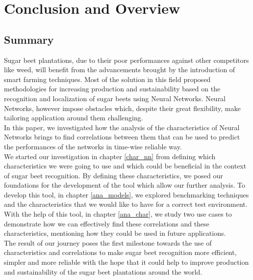 \chapter{Conclusion and Overview}

\section{Summary}
Sugar beet plantations, due to their poor performances against other competitors like weed, will benefit from the advancements brought by the introduction of smart farming techniques. Most of the solution in this field proposed methodologies for increasing production and sustainability based on the recognition and localization of sugar beets using Neural Networks. Neural Networks, however impose obstacles which, despite their great flexibility, make tailoring application around them challenging.\\ 
In this paper, we investigated how the analysis of the characteristics of Neural Networks brings to find correlations between them that can be used to predict the performances of the networks in time-wise reliable way.\\
We started our investigation in chapter \ref{char_nn} from defining which characteristics we were going to use and which could be beneficial in the context of sugar beet recognition. By defining these characteristics, we posed our foundations for the development of the tool which allow our further analysis. To develop this tool, in chapter \ref{ana_models}, we explored benchmarking techniques and the characteristics that we would like to have for a correct test environment. With the help of this tool, in chapter \ref{ana_char},  we study two use cases to demonstrate how we can effectively find these correlations and these characteristics, mentioning how they could be used in future applications. \\
The result of our journey poses the first milestone towards the use of characteristics and correlations to make sugar beet recognition more efficient, simpler and more reliable with the hope that it could help to improve production and sustainability of the sugar beet plantations around the world. 

